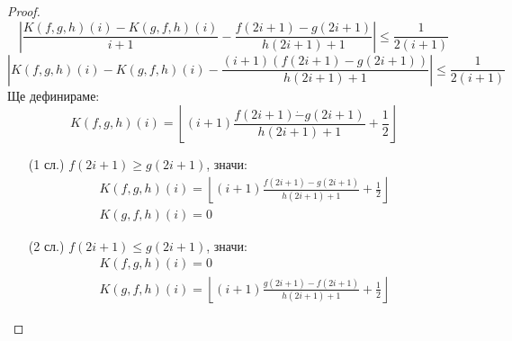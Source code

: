 \begin{proof}
    \begin{equation}
        \left|\frac{K(f, g, h)(i) - K(g, f, h)(i)}{i + 1} - \frac{f(2i+1) - g(2i+1)}{h(2i+1) + 1} \right| \leq \frac{1}{2(i+1)} 
    \end{equation}
    \begin{equation}
        \left|K(f, g, h)(i) - K(g, f, h)(i) - \frac{(i+1)(f(2i+1) - g(2i+1))}{h(2i+1) + 1} \right| \leq \frac{1}{2(i+1)}
    \end{equation}
    Ще дефинираме:
    \begin{equation}
        K(f, g, h)(i) = \left\lfloor (i+1)\frac{f(2i+1) \dot{-} g(2i+1)}{h(2i+1) + 1} + \frac{1}{2}\right\rfloor
    \end{equation}
    \begin{itemize}
        \item[(1 сл.)] $f(2i+1) \geq g(2i+1)$, значи:
        \begin{equation}
            \begin{split}
                K(f, g, h)(i) = \left\lfloor (i+1)\frac{f(2i+1) -g(2i+1)}{h(2i+1) + 1} + \frac{1}{2}\right\rfloor\\
                K(g, f, h)(i) = 0
            \end{split}
        \end{equation}
        \item[(2 сл.)] $f(2i+1) \leq g(2i+1)$, значи:
        \begin{equation}
            \begin{split}
                K(f, g, h)(i) = 0\\
                K(g, f, h)(i) = \left\lfloor (i+1)\frac{g(2i+1) - f(2i+1)}{h(2i+1) + 1} + \frac{1}{2}\right\rfloor
            \end{split}
        \end{equation}
    \end{itemize}
\end{proof}

